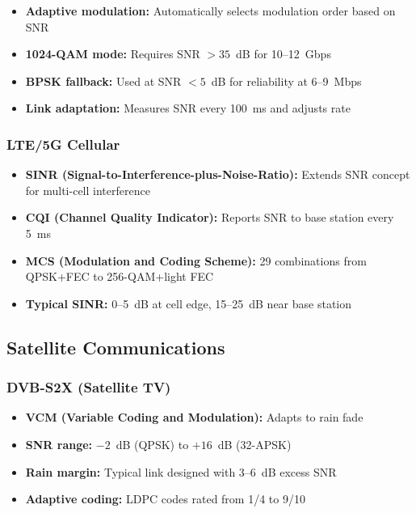 \begin{itemize}
\item \textbf{Adaptive modulation:} Automatically selects modulation order based on SNR
\item \textbf{1024-QAM mode:} Requires SNR $>35$~dB for 10--12~Gbps
\item \textbf{BPSK fallback:} Used at SNR $<5$~dB for reliability at 6--9~Mbps
\item \textbf{Link adaptation:} Measures SNR every 100~ms and adjusts rate
\end{itemize}

\subsubsection{LTE/5G Cellular}

\begin{itemize}
\item \textbf{SINR (Signal-to-Interference-plus-Noise-Ratio):} Extends SNR concept for multi-cell interference
\item \textbf{CQI (Channel Quality Indicator):} Reports SNR to base station every 5~ms
\item \textbf{MCS (Modulation and Coding Scheme):} 29 combinations from QPSK+FEC to 256-QAM+light FEC
\item \textbf{Typical SINR:} 0--5~dB at cell edge, 15--25~dB near base station
\end{itemize}

\subsection{Satellite Communications}

\subsubsection{DVB-S2X (Satellite TV)}

\begin{itemize}
\item \textbf{VCM (Variable Coding and Modulation):} Adapts to rain fade
\item \textbf{SNR range:} $-2$~dB (QPSK) to $+16$~dB (32-APSK)
\item \textbf{Rain margin:} Typical link designed with 3--6~dB excess SNR
\item \textbf{Adaptive coding:} LDPC codes rated from 1/4 to 9/10
\end{itemize}

